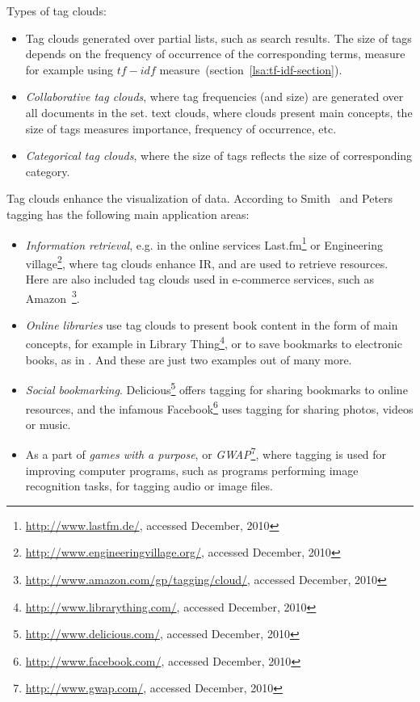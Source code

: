 Types of tag clouds: \\
\begin{itemize}
\item Tag clouds generated over partial lists, such as search results. The size of tags depends on the frequency of occurrence of the corresponding terms, measure for example using $tf-idf$  measure~(section~\ref{lsa:tf-idf-section}).\\
\item \textit{Collaborative tag clouds}, where tag frequencies (and size) are generated over all documents in the set.
text clouds, where clouds present main concepts, the size of tags measures importance, frequency of occurrence, etc. \\
\item \textit{ Categorical tag clouds}, where the size of tags reflects the size of corresponding category. \\
\end{itemize}
Tag clouds enhance the visualization of data. According to Smith~\cite{tagging2008} and Peters~\cite{folksonomiesWeb2.0_2009} tagging has the following main application areas: \\
\begin{itemize}
\item \textit{Information retrieval}, e.g. in the online services Last.fm\footnote{\url{http://www.lastfm.de/}, accessed December, 2010} or Engineering village\footnote{\url{http://www.engineeringvillage.org/}, accessed December, 2010}, where tag clouds enhance \gls{IR}, and are used to retrieve resources. Here are also included tag clouds used in e-commerce services, such as Amazon~\footnote{\url{http://www.amazon.com/gp/tagging/cloud/}, accessed December, 2010}.

\item \textit{Online libraries} use tag clouds to present book content in the form of main concepts, for example in Library Thing\footnote{\url{http://www.librarything.com/}, accessed December, 2010}, or to save bookmarks to electronic books, as in  . And these are just two examples out of many more. \\

\item \textit{Social bookmarking}. Delicious\footnote{\url{http://www.delicious.com/}, accessed December, 2010} offers tagging for sharing bookmarks to online resources, and the infamous Facebook\footnote{\url{http://www.facebook.com/}, accessed December, 2010}  uses tagging for sharing photos, videos or music. \\

\item As a part of \textit{games with a purpose}, or \textit{GWAP}\footnote{\url{http://www.gwap.com/}, accessed December, 2010}, where tagging is used for improving computer programs, such as programs performing image recognition tasks, for tagging audio or image files. \\ 
\end{itemize}

